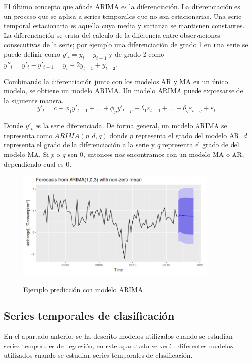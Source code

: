 El último concepto que añade ARIMA es la diferenciación. La diferenciación es un proceso que se aplica a series temporales que no son estacionarias. Una serie temporal estacionaria es aquella cuya media y varianza se mantienen constantes. La diferenciación se trata del calculo de la diferencia entre observaciones consecutivas de la serie; por ejemplo una diferenciación de grado 1 en una serie se puede definir como $ y'_t = y_t - y_{t-1}$ y de grado 2 como $y''_t = y'_t - y'_{t-1} = y_t - 2y_{t-1} + y_{t-2}$.\newline

Combinando la diferenciación junto con los modelos AR y MA en un único modelo, se obtiene un modelo ARIMA. Un modelo ARIMA puede expresarse de la siguiente manera.
$$ y'_t = c + \phi_1 y'_{t-1} + ... + \phi_p y'_{t-p} + \theta_1 \varepsilon_{t-1} + ... + \theta_q \varepsilon_{t-q} + \varepsilon_t $$

Donde $y'_t$ es la serie diferenciada. De forma general, un modelo ARIMA se representa como $ARIMA(p,d,q)$ donde $p$ representa el grado del modelo AR, $d$ representa el grado de la diferenciación a la serie y $q$ representa el grado de del modelo MA. Si $p$ o $q$ son 0, entonces nos encontramos con un modelo MA o AR, dependiendo cual es 0.\newline

\begin{figure}[h]
	\centering
	\includegraphics[width=100mm]{imagenes/arima_example.png}
	\label{fig:213}
	\caption{Ejemplo predicción con modelo ARIMA.}
\end{figure}
\newpage
\subsection{Series temporales de clasificación}
En el apartado anterior se ha descrito modelos utilizados cuando se estudian series temporales de regresión; en este aparatado se verán diferentes modelos utilizados cuando se estudian series temporales de clasificación.\newline

